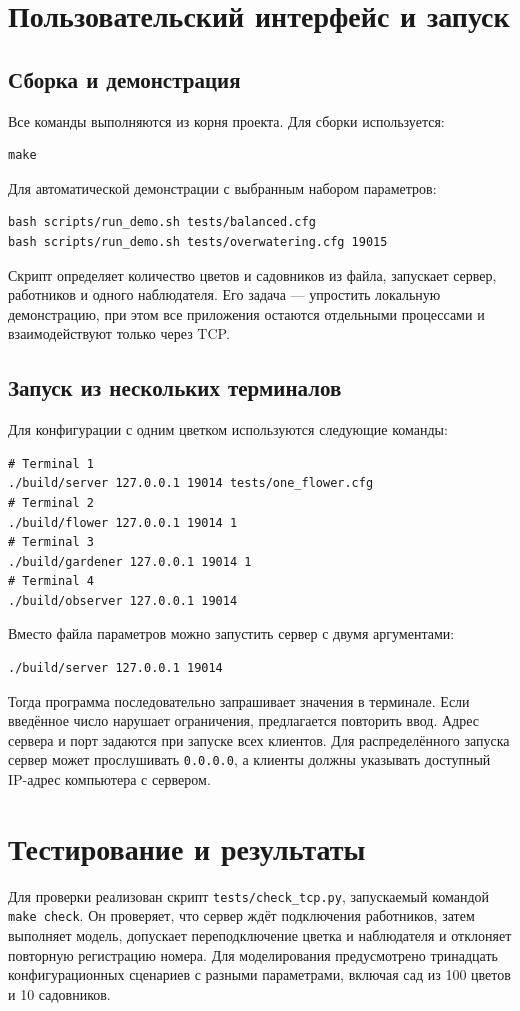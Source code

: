 \documentclass[12pt,a4paper]{article}
\begin{document}
\section{Пользовательский интерфейс и запуск}
\subsection{Сборка и демонстрация}
Все команды выполняются из корня проекта. Для сборки используется:
\begin{lstlisting}
make
\end{lstlisting}

Для автоматической демонстрации с выбранным набором параметров:
\begin{lstlisting}
bash scripts/run_demo.sh tests/balanced.cfg
bash scripts/run_demo.sh tests/overwatering.cfg 19015
\end{lstlisting}

Скрипт определяет количество цветов и садовников из файла, запускает сервер, работников и одного наблюдателя. Его задача --- упростить локальную демонстрацию, при этом все приложения остаются отдельными процессами и взаимодействуют только через TCP.

\subsection{Запуск из нескольких терминалов}
Для конфигурации с одним цветком используются следующие команды:
\begin{lstlisting}
# Terminal 1
./build/server 127.0.0.1 19014 tests/one_flower.cfg
# Terminal 2
./build/flower 127.0.0.1 19014 1
# Terminal 3
./build/gardener 127.0.0.1 19014 1
# Terminal 4
./build/observer 127.0.0.1 19014
\end{lstlisting}

Вместо файла параметров можно запустить сервер с двумя аргументами:
\begin{lstlisting}
./build/server 127.0.0.1 19014
\end{lstlisting}

Тогда программа последовательно запрашивает значения в терминале. Если введённое число нарушает ограничения, предлагается повторить ввод. Адрес сервера и порт задаются при запуске всех клиентов. Для распределённого запуска сервер может прослушивать \texttt{0.0.0.0}, а клиенты должны указывать доступный IP-адрес компьютера с сервером.

\section{Тестирование и результаты}
Для проверки реализован скрипт \texttt{tests/check\_tcp.py}, запускаемый командой \texttt{make check}. Он проверяет, что сервер ждёт подключения работников, затем выполняет модель, допускает переподключение цветка и наблюдателя и отклоняет повторную регистрацию номера. Для моделирования предусмотрено тринадцать конфигурационных сценариев с разными параметрами, включая сад из 100 цветов и 10 садовников.
\end{document}
